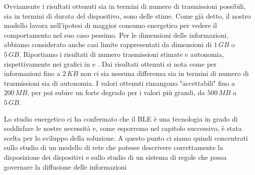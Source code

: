 Ovviamente i risultati ottenuti sia in termini di numero di trasmissioni possibili, sia in termini di durata del dispositivo, sono delle stime. Come già detto, il nostro modello lavora nell'ipotesi di maggior consumo energetico per vedere il comportamento nel suo caso pessimo. Per le dimensioni delle informazioni, abbiamo considerato anche casi limite rappresentati da dimensioni di $1\,GB$ o $5\,GB$. Riportiamo i risultati di numero trasmissioni stimate e autonomia, rispettivamente nei grafici in  e . Dai risultati ottenuti si nota come per informazioni fino a $2\,KB$ non ci sia nessuna differenza sia in termini di numero di trasmissioni sia di autonomia. I valori ottenuti rimangono "accettabili" fino a $200\,MB$, per poi subire un forte degrado per i valori più grandi, da $500\,MB$ a $5\,GB$.

Lo studio energetico ci ha confermato che il \acs{BLE} è una tecnologia in grado di soddisfare le nostre necessità e, come esporremo nel capitolo successivo, è stata scelta per lo sviluppo della soluzione. A questo punto ci siamo quindi concentrati sullo studio di un modello di rete che potesse descrivere correttamente la disposizione dei dispositivi e sullo studio di un sistema di regole che possa governare la diffusione delle informazioni

